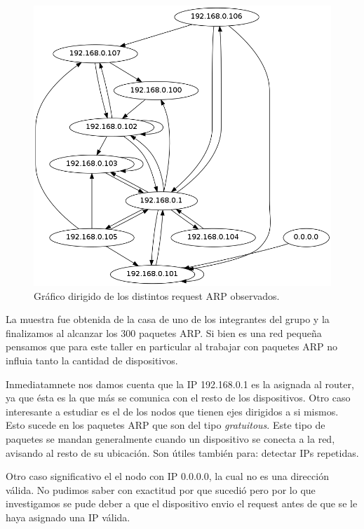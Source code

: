 \documentclass[a4paper]{article}
\begin{document}
\begin{figure}[H]
  \centering
  \includegraphics[scale=0.30]{graficos/arpGraph.png}
  \caption{Gráfico dirigido de los distintos request ARP observados.}
\end{figure}

 
 La muestra fue obtenida de la casa de uno de los integrantes del grupo y la finalizamos al alcanzar los 300 paquetes ARP.  
Si bien es una red pequeña pensamos que para este taller en particular al trabajar con paquetes ARP no influia tanto la cantidad de dispositivos.

Inmediatamnete nos damos cuenta que la IP 192.168.0.1 es la asignada al router, ya que ésta es la que más se comunica con el resto de los dispositivos. 
Otro caso interesante a estudiar es el de los nodos que tienen ejes dirigidos a si mismos. Esto sucede en los paquetes ARP que son del tipo \textit{gratuitous}. Este tipo de paquetes se mandan generalmente cuando un dispositivo se conecta a la red, avisando al resto de su ubicación. Son útiles también para: detectar IPs repetidas.

Otro caso significativo el el nodo con IP 0.0.0.0, la cual no es una dirección válida. No pudimos saber con exactitud por que sucedió pero por lo que investigamos se pude deber a que el dispositivo envio el request antes de que se le haya asignado una IP válida. 


 
\end{document}
